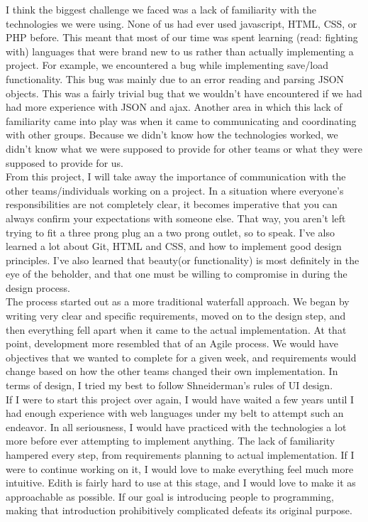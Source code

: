 \documentclass[12pt]{article}
\begin{document}
I think the biggest challenge we faced was a lack of familiarity with the technologies we were using. None of us had ever used javascript, HTML, CSS, or PHP before. This meant that most of our time was spent learning (read: fighting with) languages that were brand new to us rather than actually implementing a project. For example, we encountered a bug while implementing save/load functionality. This bug was mainly  due to an error reading and parsing JSON objects. This was a fairly trivial bug that we wouldn't have encountered if we had had more experience with JSON and ajax. Another area in which this lack of familiarity came into play was when it came to communicating and coordinating with other groups. Because we didn't know how the technologies worked, we didn't know what we were supposed to provide for other teams or what they were supposed to provide for us.\\

From this project, I will take away the importance of communication with the other teams/individuals working on a project. In a situation where everyone's responsibilities are not completely clear, it becomes imperative that you can always confirm your expectations with someone else. That way, you aren't left trying to fit a three prong plug an a two prong outlet, so to speak. I've also learned a lot about Git, HTML and CSS, and how to implement good design principles. I've also learned that beauty(or functionality) is most definitely in the eye of the beholder, and that one must be willing to compromise in during the design process.\\

The process started out as a more traditional waterfall approach. We began by writing very clear and specific requirements, moved on to the design step, and then everything fell apart when it came to the actual implementation. At that point, development more resembled that of an Agile process. We would have objectives that we wanted to complete for a given week, and requirements would change based on how the other teams changed their own implementation. In terms of design, I tried my best to follow Shneiderman's rules of UI design.\\

If I were to start this project over again, I would have waited a few years until I had enough experience with web languages under my belt to attempt such an endeavor. In all seriousness, I would have practiced with the technologies a lot more before ever attempting to implement anything. The lack of familiarity hampered every step, from requirements planning to actual implementation. If I were to continue working on it, I would love to make everything feel much more intuitive. Edith is fairly hard to use at this stage, and I would love to make it as approachable as possible. If our goal is introducing people to programming, making that introduction prohibitively complicated defeats its original purpose.
\end{document}
